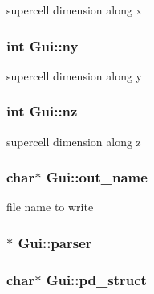 supercell dimension along x 

\hypertarget{class_gui_a6a052cca0478f86e3c80535db522fe0a}{}
\subsubsection[{ny}]{\setlength{\rightskip}{0pt plus 5cm}int Gui\+::ny}\label{class_gui_a6a052cca0478f86e3c80535db522fe0a}


supercell dimension along y 

\hypertarget{class_gui_aa2511bfa549615e75150f6e5fe81b5c0}{}
\subsubsection[{nz}]{\setlength{\rightskip}{0pt plus 5cm}int Gui\+::nz}\label{class_gui_aa2511bfa549615e75150f6e5fe81b5c0}


supercell dimension along z 

\hypertarget{class_gui_a29e73c724fb7465a012847876688c405}{}
\subsubsection[{out\+\_\+name}]{\setlength{\rightskip}{0pt plus 5cm}char$\ast$ Gui\+::out\+\_\+name}\label{class_gui_a29e73c724fb7465a012847876688c405}


file name to write 

\hypertarget{class_gui_a768d5cc7d6721405061620216159d20d}{}
\subsubsection[{parser}]{$\ast$ Gui\+::parser\hspace{0.3cm}{\ttfamily [private]}}\label{class_gui_a768d5cc7d6721405061620216159d20d}
\hypertarget{class_gui_ad256ded075bfb167743bb388ec301fe4}{}
\subsubsection[{pd\+\_\+struct}]{\setlength{\rightskip}{0pt plus 5cm}char$\ast$ Gui\+::pd\+\_\+struct}\label{class_gui_ad256ded075bfb167743bb388ec301fe4}


